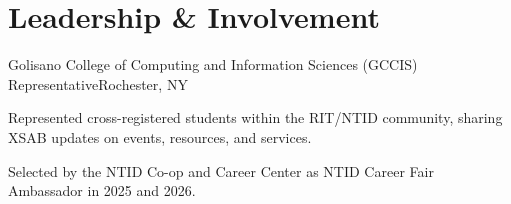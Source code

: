 \section{Leadership \& Involvement}

      {Golisano College of Computing and Information Sciences (GCCIS) Representative}{Rochester, NY}
\begin{highlights}
  \item Represented cross-registered students within the RIT/NTID community, sharing XSAB updates on events, resources, and services.
  \item Selected by the NTID Co-op and Career Center as NTID Career Fair Ambassador in 2025 and 2026.
\end{highlights}


